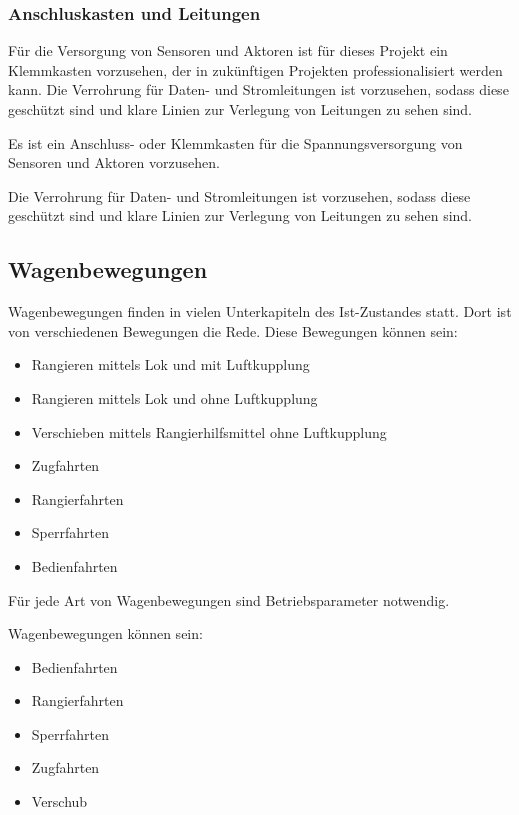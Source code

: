 \subsubsection{Anschluskasten und Leitungen}
Für die Versorgung von Sensoren und Aktoren ist für dieses Projekt ein Klemmkasten vorzusehen, der in zukünftigen Projekten professionalisiert werden kann. 
Die Verrohrung für Daten- und Stromleitungen ist vorzusehen, sodass diese geschützt sind und klare Linien zur Verlegung von Leitungen zu sehen sind. \par
\begin{feat}
Es ist ein Anschluss- oder Klemmkasten für die Spannungsversorgung von Sensoren und Aktoren vorzusehen. 
\end{feat}
\begin{feat}
Die Verrohrung für Daten- und Stromleitungen ist vorzusehen, sodass diese geschützt sind und klare Linien zur Verlegung von Leitungen zu sehen sind.
\end{feat}

\subsection{Wagenbewegungen}

Wagenbewegungen finden in vielen Unterkapiteln des Ist-Zustandes statt. Dort ist von verschiedenen Bewegungen die Rede. Diese Bewegungen können sein:
\begin{itemize}
    \item Rangieren mittels Lok und mit Luftkupplung
    \item Rangieren mittels Lok und ohne Luftkupplung
    \item Verschieben mittels Rangierhilfsmittel ohne Luftkupplung
    \item Zugfahrten
    \item Rangierfahrten
    \item Sperrfahrten
    \item Bedienfahrten
\end{itemize}
\begin{feat}
Für jede Art von Wagenbewegungen sind Betriebsparameter notwendig.
\end{feat}
\begin{rem}
Wagenbewegungen können sein:
\begin{itemize}
    \item Bedienfahrten
    \item Rangierfahrten
    \item Sperrfahrten
    \item Zugfahrten
    \item Verschub
\end{itemize}
\end{rem}


